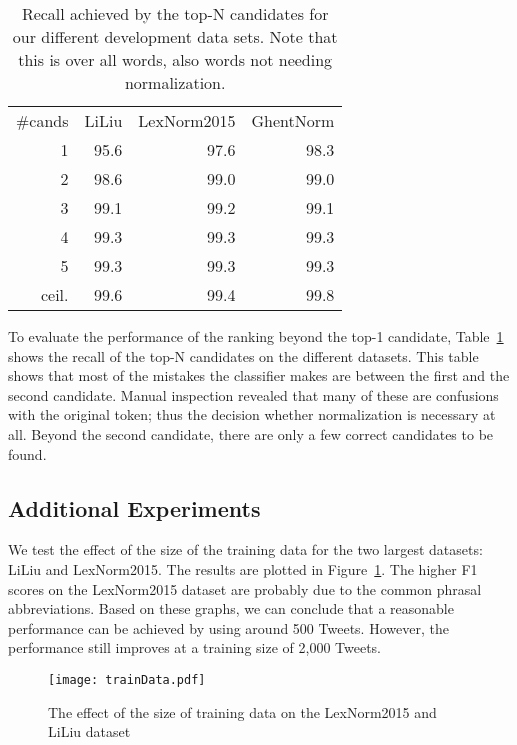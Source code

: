 \documentclass[a4paper,10pt,twoside]{article}
\begin{document}
\begin{table}
    \centering
    \begin{tabular}{r r r r}
        \#cands & LiLiu & LexNorm2015 & GhentNorm \\
        1       & 95.6  & 97.6        & 98.3\\
        2       & 98.6  & 99.0        & 99.0\\
        3       & 99.1  & 99.2        & 99.1\\
        4       & 99.3  & 99.3        & 99.3\\
        5       & 99.3  & 99.3        & 99.3\\
        ceil.   & 99.6  & 99.4        & 99.8 \\
    \end{tabular}
    \caption{Recall achieved by the top-N candidates for our different development data sets. Note that this is over all words, also words not needing normalization.}
    \label{tab:numCands}
\end{table}

To evaluate the performance of the ranking beyond the top-1 candidate,
Table~\ref{tab:numCands} shows the recall of the top-N candidates on the
different datasets. This table shows that most of the mistakes the classifier
makes are between the first and the second candidate. Manual inspection
revealed that many of these are confusions with the original token; thus the
decision whether normalization is necessary at all. Beyond the second
candidate, there are only a few correct candidates to be found.

\subsection{Additional Experiments}
We test the effect of the size of the training data for the two largest
datasets: LiLiu and LexNorm2015. The results are plotted in
Figure~\ref{fig:trainData}. The higher F1 scores on the LexNorm2015 dataset are
probably due to the common phrasal abbreviations.  Based on these graphs, we can
conclude that a reasonable performance can be achieved by using around 500
Tweets.  However, the performance still improves at a training size of 2,000
Tweets.

\begin{figure}
    \centering
    \texttt{[image: trainData.pdf]}
    \caption{The effect of the size of training data on the LexNorm2015 and LiLiu dataset}
    \label{fig:trainData}
\end{figure}
\end{document}
